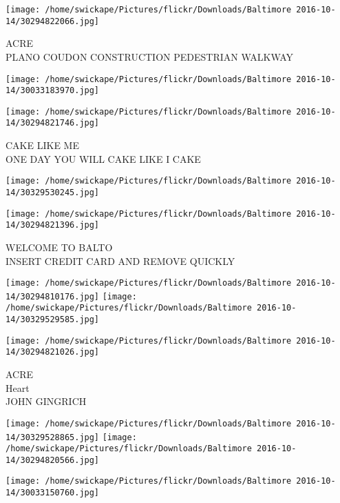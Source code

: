 \documentclass[10pt,letterpaper]{article}
\begin{document}
\vspace{0.25in}
\texttt{[image: /home/swickape/Pictures/flickr/Downloads/Baltimore 2016-10-14/30294822066.jpg]}

ACRE\\
PLANO COUDON CONSTRUCTION PEDESTRIAN WALKWAY\\
\pagebreak

\texttt{[image: /home/swickape/Pictures/flickr/Downloads/Baltimore 2016-10-14/30033183970.jpg]}

\vspace{0.25in}
\texttt{[image: /home/swickape/Pictures/flickr/Downloads/Baltimore 2016-10-14/30294821746.jpg]}

CAKE LIKE ME\\
ONE DAY YOU WILL CAKE LIKE I CAKE\\
\pagebreak

\texttt{[image: /home/swickape/Pictures/flickr/Downloads/Baltimore 2016-10-14/30329530245.jpg]}

\vspace{0.25in}
\texttt{[image: /home/swickape/Pictures/flickr/Downloads/Baltimore 2016-10-14/30294821396.jpg]}

WELCOME TO BALTO\\
INSERT CREDIT CARD AND REMOVE QUICKLY\\
\pagebreak

\texttt{[image: /home/swickape/Pictures/flickr/Downloads/Baltimore 2016-10-14/30294810176.jpg]}
\texttt{[image: /home/swickape/Pictures/flickr/Downloads/Baltimore 2016-10-14/30329529585.jpg]}

\vspace{0.25in}
\texttt{[image: /home/swickape/Pictures/flickr/Downloads/Baltimore 2016-10-14/30294821026.jpg]}

ACRE\\
Heart\\
JOHN GINGRICH\\
\pagebreak

\texttt{[image: /home/swickape/Pictures/flickr/Downloads/Baltimore 2016-10-14/30329528865.jpg]}
\texttt{[image: /home/swickape/Pictures/flickr/Downloads/Baltimore 2016-10-14/30294820566.jpg]}

\vspace{0.25in}
\texttt{[image: /home/swickape/Pictures/flickr/Downloads/Baltimore 2016-10-14/30033150760.jpg]}
\end{document}
